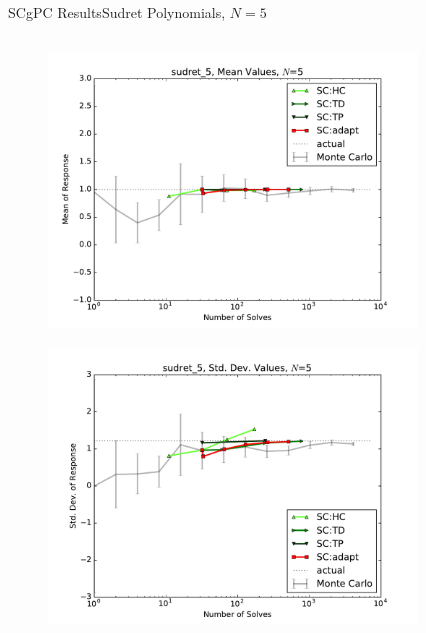 \documentclass{beamer}
\begin{document}
\begin{frame}{SCgPC Results}{Sudret Polynomials, $N=5$}\vspace{-20pt}
 \begin{columns}
   \begin{column}{0.5\textwidth}
        \begin{figure}[h!]
          \centering
          \includegraphics[width=0.8\linewidth]{anlmodels/sudret_5_mean_vals_nohdmr}
        \end{figure}
        \vspace{-20pt}
        \begin{figure}[h!]
          \centering
          \includegraphics[width=0.8\linewidth]{anlmodels/sudret_5_var_vals_nohdmr}
        \end{figure}
   \end{column}
   \begin{column}{0.5\textwidth}
        \begin{figure}[h!]
          \centering

\end{figure}
\end{column}
\end{columns}
\end{frame}
\end{document}
